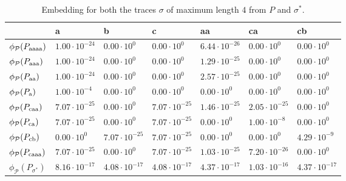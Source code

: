
\begin{table}[!t]
	\centering
	\caption{Embedding for both the traces $\sigma$ of maximum length $4$ from $P$ and  $\sigma^*$.}\label{tab:emb2}\label{tab:embsitar}
	\begin{tabular}{l|l|l|l|l|l|l|}
		\toprule
		& a    & b                                                   & c    & aa   & ca   & cb   \\
		\midrule
		
		
		$\phi_{\mathcal{P}}(P_\textup{aaaa})$ & $1.00\cdot 10^{-24}$ & $0.00\cdot 10^{0}$ & $0.00\cdot 10^{0}$& $6.44\cdot 10^{-26}$& $0.00\cdot 10^{0}$& $0.00\cdot 10^{0}$\\
		$\phi_{\mathcal{P}}(P_\textup{aaa})$ & $1.00\cdot 10^{-24}$ & $0.00\cdot 10^{0}$ & $0.00\cdot 10^{0}$& $1.29\cdot 10^{-25}$& $0.00\cdot 10^{0}$& $0.00\cdot 10^{0}$\\
		$\phi_{\mathcal{P}}(P_\textup{aa})$ & $1.00\cdot 10^{-24}$ & $0.00\cdot 10^{0}$ & $0.00\cdot 10^{0}$& $2.57\cdot 10^{-25}$& $0.00\cdot 10^{0}$& $0.00\cdot 10^{0}$\\
		$\phi_{\mathcal{P}}(P_\textup{a})$ & $1.00\cdot 10^{-4}$ & $0.00\cdot 10^{0}$ & $0.00\cdot 10^{0}$& $0.00\cdot 10^{0}$& $0.00\cdot 10^{0}$& $0.00\cdot 10^{0}$\\
		$\phi_{\mathcal{P}}(P_\textup{caa})$ & $7.07\cdot 10^{-25}$ & $0.00\cdot 10^{0}$ & $7.07\cdot 10^{-25}$& $1.46\cdot 10^{-25}$& $2.05\cdot 10^{-25}$& $0.00\cdot 10^{0}$\\
		$\phi_{\mathcal{P}}(P_\textup{ca})$ & $7.07\cdot 10^{-25}$ & $0.00\cdot 10^{0}$ & $7.07\cdot 10^{-25}$& $0.00\cdot 10^{0}$& $1.00\cdot 10^{-8}$& $0.00\cdot 10^{0}$\\
		$\phi_{\mathcal{P}}(P_\textup{cb})$ &  $0.00\cdot 10^{0}$ & $7.07\cdot 10^{-25}$ & $7.07\cdot 10^{-25}$& $0.00\cdot 10^{0}$&  $0.00\cdot 10^{0}$ & $4.29\cdot 10^{-9}$\\
		$\phi_{\mathcal{P}}(P_\textup{caaa})$  & $7.07\cdot 10^{-25}$ &  $0.00\cdot 10^{0}$ & $7.07\cdot 10^{-25}$& $1.03\cdot 10^{-25}$&  $7.20\cdot 10^{-26}$ & $0.00\cdot 10^{0}$\\
		\bottomrule 
				$\phi_{\mathcal{P}}(P_{\sigma^*})$ & $8.16\cdot10^{-17}$ & $4.08\cdot 10^{-17}$ & $4.08\cdot10^{-17}$ & $4.37\cdot 10^{-17}$ & $1.03\cdot10^{-16}$ & $4.37\cdot10^{-17}$\\

\end{tabular}
\end{table}
